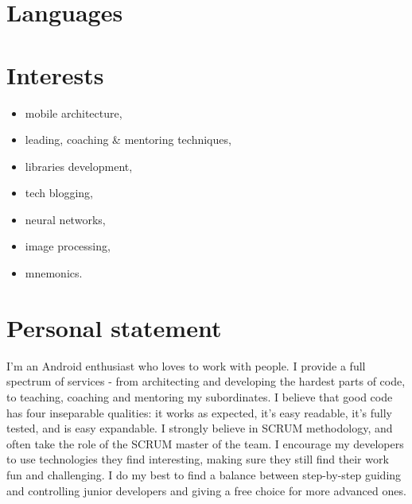 \documentclass[letterpaper]{twentysecondcv} %
\begin{document}

\section{Languages}

\begin{twentyshort} %
\end{twentyshort}
\vspace{2\parsep}


\section{Interests}

\begin{itemize}
\setlength\itemsep{-0.6em}

\item mobile architecture,
\item leading, coaching \& mentoring techniques,
\item libraries development,
\item tech blogging,
\item neural networks,
\item image processing,
\item mnemonics.
\end{itemize}
\vspace{2\parsep}


\section{Personal statement}

I'm an Android enthusiast who loves to work with people. I provide a full spectrum of services - from architecting and developing the hardest parts of code, to teaching, coaching and mentoring my subordinates. I believe that good code has four inseparable qualities: it works as expected, it's easy readable, it's fully tested, and is easy expandable. I strongly believe in SCRUM methodology, and often take the role of the SCRUM master of the team. I encourage my developers to use technologies they find interesting, making sure they still find their work fun and challenging. I do my best to find a balance between step-by-step guiding and controlling junior developers and giving a free choice for more advanced ones.
\end{document}
